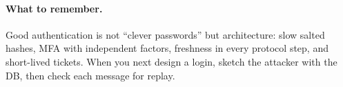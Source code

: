 \paragraph{What to remember.} Good authentication is not ``clever passwords'' but architecture: slow salted hashes, MFA with independent factors, freshness in every protocol step, and short-lived tickets. When you next design a login, sketch the attacker with the DB, then check each message for replay.
